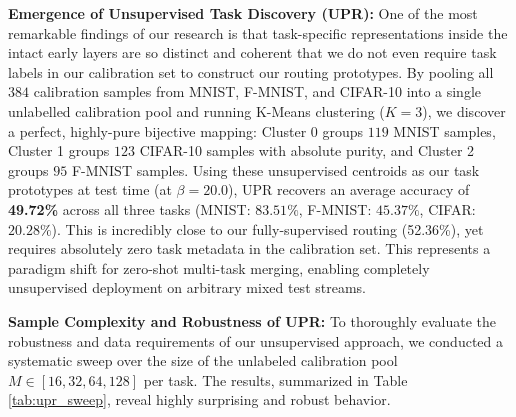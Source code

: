 \documentclass{article}
\theoremstyle{plain}
\theoremstyle{definition}
\theoremstyle{remark}
\begin{document}
\textbf{Emergence of Unsupervised Task Discovery (UPR):} One of the most remarkable findings of our research is that task-specific representations inside the intact early layers are so distinct and coherent that we do not even require task labels in our calibration set to construct our routing prototypes. By pooling all $384$ calibration samples from MNIST, F-MNIST, and CIFAR-10 into a single unlabelled calibration pool and running K-Means clustering ($K=3$), we discover a perfect, highly-pure bijective mapping: Cluster 0 groups $119$ MNIST samples, Cluster 1 groups $123$ CIFAR-10 samples with absolute purity, and Cluster 2 groups $95$ F-MNIST samples.
Using these unsupervised centroids as our task prototypes at test time (at $\beta = 20.0$), UPR recovers an average accuracy of \textbf{49.72\%} across all three tasks (MNIST: $83.51\%$, F-MNIST: $45.37\%$, CIFAR: $20.28\%$). This is incredibly close to our fully-supervised routing (52.36\%), yet requires absolutely zero task metadata in the calibration set. This represents a paradigm shift for zero-shot multi-task merging, enabling completely unsupervised deployment on arbitrary mixed test streams.

\begin{table}[htbp]
\caption{Sample complexity, clustering purity, and routing performance of Unsupervised Prototype Routing (UPR) across calibration sizes $M$ per task. All evaluations report average test accuracy (\%) across MNIST, F-MNIST, and CIFAR-10.}
\label{tab:upr_sweep}
\begin{center}
\begin{small}
\end{small}
\end{center}
\end{table}

\textbf{Sample Complexity and Robustness of UPR:}
To thoroughly evaluate the robustness and data requirements of our unsupervised approach, we conducted a systematic sweep over the size of the unlabeled calibration pool $M \in [16, 32, 64, 128]$ per task. The results, summarized in Table \ref{tab:upr_sweep}, reveal highly surprising and robust behavior. 
\end{document}
